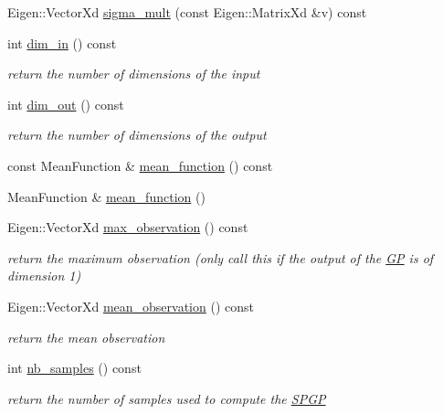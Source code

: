 \begin{DoxyCompactItemize}
Eigen\+::\+Vector\+Xd \hyperlink{classlimbo_1_1model_1_1_s_p_g_p_aed832adbf5fcfa305aac4699d809677e}{sigma\+\_\+mult} (const Eigen\+::\+Matrix\+Xd \&v) const 
\item 
int \hyperlink{classlimbo_1_1model_1_1_s_p_g_p_ab84d7663a814757766c2d630e0bacd9e}{dim\+\_\+in} () const 
\begin{DoxyCompactList}\small\item\em return the number of dimensions of the input \end{DoxyCompactList}\item 
int \hyperlink{classlimbo_1_1model_1_1_s_p_g_p_a605b47cf6ecf50c2436cbad531099d16}{dim\+\_\+out} () const 
\begin{DoxyCompactList}\small\item\em return the number of dimensions of the output \end{DoxyCompactList}\item 
const Mean\+Function \& \hyperlink{classlimbo_1_1model_1_1_s_p_g_p_a4bb34b4001647ebbfd0e949b35c39a0c}{mean\+\_\+function} () const 
\item 
Mean\+Function \& \hyperlink{classlimbo_1_1model_1_1_s_p_g_p_afd6a1362afffaff3ed58ab17b49bd0b4}{mean\+\_\+function} ()
\item 
Eigen\+::\+Vector\+Xd \hyperlink{classlimbo_1_1model_1_1_s_p_g_p_a579bcd7df20371291633b45be1ec73b4}{max\+\_\+observation} () const 
\begin{DoxyCompactList}\small\item\em return the maximum observation (only call this if the output of the \hyperlink{classlimbo_1_1model_1_1_g_p}{G\+P} is of dimension 1) \end{DoxyCompactList}\item 
Eigen\+::\+Vector\+Xd \hyperlink{classlimbo_1_1model_1_1_s_p_g_p_a1d586dd8c2b9a1bce6ab3b39ba42c380}{mean\+\_\+observation} () const 
\begin{DoxyCompactList}\small\item\em return the mean observation \end{DoxyCompactList}\item 
int \hyperlink{classlimbo_1_1model_1_1_s_p_g_p_a9d3bcefa04f22fef8ad518358512154d}{nb\+\_\+samples} () const 
\begin{DoxyCompactList}\small\item\em return the number of samples used to compute the \hyperlink{classlimbo_1_1model_1_1_s_p_g_p}{S\+P\+G\+P} \end{DoxyCompactList}\item 

\end{DoxyCompactItemize}
